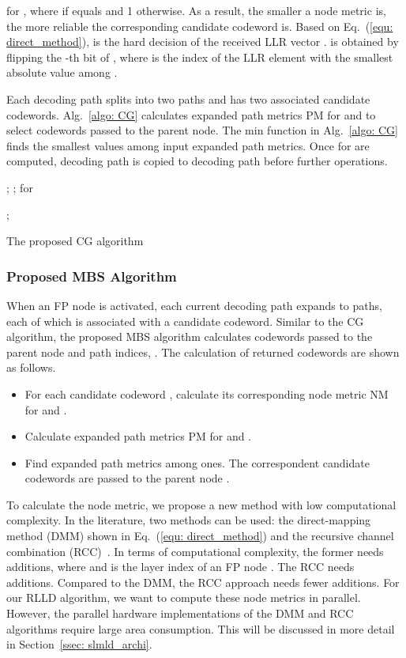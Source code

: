 \documentclass[journal]{IEEEtran}
\begin{document}
for , where  if  equals  and 1 otherwise. As a result, the smaller a node metric is, the more reliable the corresponding candidate codeword is. Based on Eq.~(\ref{equ: direct_method}),  is the hard decision of the received LLR vector .  is obtained by flipping the -th bit of , where  is the index of the LLR element with the smallest absolute value among .


Each decoding path splits into two paths and has two associated candidate codewords. Alg.~\ref{algo: CG} calculates  expanded path metrics PM for  and  to select  codewords passed to the parent node. The min function in Alg.~\ref{algo: CG} finds the  smallest values among  input expanded path metrics. Once  for  are computed, decoding path  is copied to decoding path  before further operations.

\begin{algorithm}
\DontPrintSemicolon
\label{algo: CG}

\Input{}
\Output{; }
\BlankLine

\For{ \KwTo } {
\;
; \;
; \;
 for \;
}

\For{ \KwTo } {
; \;
}
\caption{The proposed CG algorithm}
\end{algorithm}




\subsubsection{Proposed MBS Algorithm} \label{ssec: mld}



When an FP node is activated, each current decoding path expands to  paths, each of which is associated with a candidate codeword. Similar to the CG algorithm, the proposed MBS algorithm calculates  codewords passed to the parent node and  path indices, . The calculation of returned codewords are shown as follows.
\begin{itemize}
\item For each candidate codeword ,  calculate its corresponding node metric NM for  and .
\item Calculate  expanded path metrics PM for  and .
\item Find  expanded path metrics among  ones. The correspondent candidate codewords are passed to the parent node .
\end{itemize}


To calculate the node metric, we propose a new method with low computational complexity. In the literature, two methods can be used: the direct-mapping method (DMM) shown in Eq.~(\ref{equ: direct_method}) and the recursive channel
combination (RCC)~\cite{chenrong_tsp}. In terms of computational
complexity, the former needs  additions,
where  and  is the layer index
of an FP node . The RCC needs  additions.
Compared to the DMM, the RCC approach needs fewer additions. For our RLLD algorithm, we want to compute these  node metrics in parallel. However, the parallel hardware implementations of the DMM and RCC algorithms require large area consumption. This will be discussed in more detail in Section~\ref{ssec: slmld_archi}.
\end{document}
